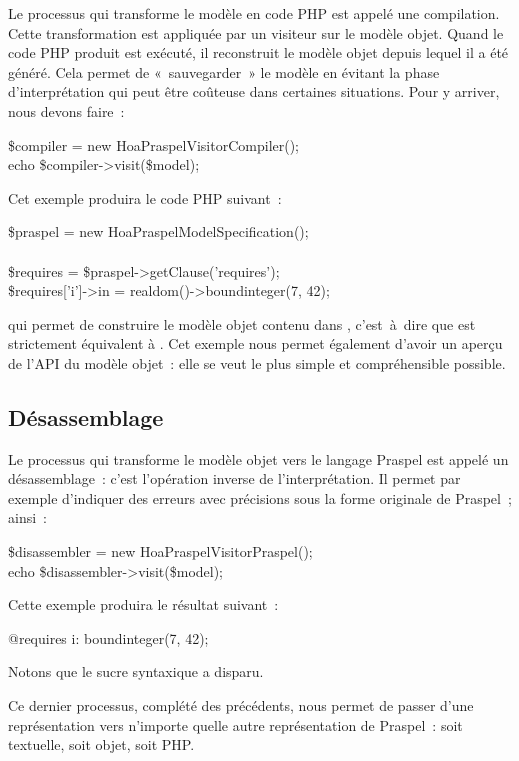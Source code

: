 Le processus qui transforme le modèle en code PHP est appelé une compilation.
Cette transformation est appliquée par un visiteur sur le modèle objet. Quand
le code PHP produit est exécuté, il reconstruit le modèle objet depuis lequel il
a été généré. Cela permet de «~sauvegarder~» le modèle en évitant la phase
d'interprétation qui peut être coûteuse dans certaines situations. Pour y
arriver, nous devons faire~:
%
\begin{pre}
\$compiler = new Hoa\bslash{}Praspel\bslash{}Visitor\bslash{}Compiler(); \\
echo \$compiler->visit(\$model);
\end{pre}
%
Cet exemple produira le code PHP suivant~:
%
\begin{pre}
\$praspel = new \bslash{}Hoa\bslash{}Praspel\bslash{}Model\bslash{}Specification(); \\
 \\
\$requires = \$praspel->getClause('requires'); \\
\$requires['i']->in = realdom()->boundinteger(7, 42);
\end{pre}
%
qui permet de construire le modèle objet contenu dans ,
c'est~à~dire que  est strictement équivalent à .
Cet exemple nous permet également d'avoir un aperçu de l'API du modèle objet~:
elle se veut le plus simple et compréhensible possible.

\subsection{Désassemblage}
\label{subsection:tools:disassembler}

Le processus qui transforme le modèle objet vers le langage Praspel est appelé
un désassemblage~: c'est l'opération inverse de l'interprétation. Il permet par
exemple d'indiquer des erreurs avec précisions sous la forme originale de
Praspel~; ainsi~:
%
\begin{pre}
\$disassembler = new Hoa\bslash{}Praspel\bslash{}Visitor\bslash{}Praspel(); \\
echo \$disassembler->visit(\$model);
\end{pre}
Cette exemple produira le résultat suivant~:
%
\begin{pre}
@requires i: boundinteger(7, 42);
\end{pre}
%
Notons que le sucre syntaxique  a disparu.

Ce dernier processus, complété des précédents, nous permet de passer d'une
représentation vers n'importe quelle autre représentation de Praspel~: soit
textuelle, soit objet, soit PHP.

